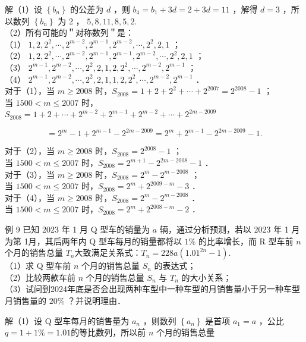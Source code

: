 \documentclass[10pt]{article}
\begin{document}
解（1）设 \(\left\{b_{n}\right\}\) 的公差为 \(d\) ，则 \(b_{4}=b_{1}+3 d=2+3 d=11\) ，解得 \(d=3\) ，所以数列 \(\left\{b_{n}\right\}\) 为 2 ， \(5,8,11,8,5,2\).\\
（2）所有可能的＂对称数列＂是：\\
（1） \(1,2,2^{2}, \cdots, 2^{m-2}, 2^{m-1}, 2^{m-2}, \cdots, 2^{2}, 2,1\) ；\\
（2） \(1,2,2^{2}, \cdots, 2^{m-2}, 2^{m-1}, 2^{m-1}, 2^{m-2}, \cdots, 2^{2}, 2,1\) ；\\
（3） \(2^{m-1}, 2^{m-2}, \cdots, 2^{2}, 2,1,2,2^{2}, \cdots, 2^{m-2}, 2^{m-1}\) ；\\
（4） \(2^{m-1}, 2^{m-2}, \cdots, 2^{2}, 2,1,1,2,2^{2}, \cdots, 2^{m-2}, 2^{m-1}\) ．\\
对于（1），当 \(m \geqslant 2008\) 时，\(S_{2008}=1+2+2^{2}+\cdots+2^{2007}=2^{2008}-1\) ；\\
当 \(1500<m \leqslant 2007\) 时，\(S_{2008}=1+2+\cdots+2^{m-2}+2^{m-1}+2^{m-2}+\cdots+2^{2 m-2009}\)

\[
=2^{m}-1+2^{m-1}-2^{2 m-2009}=2^{m}+2^{m-1}-2^{2 m-2009}-1 .
\]

对于（2），当 \(m \geqslant 2008\) 时，\(S_{2008}=2^{2008}-1\) ；\\
当 \(1500<m \leqslant 2007\) 时，\(S_{2008}=2^{m+1}-2^{2 m-2008}-1\) ．\\
对于（3），当 \(m \geqslant 2008\) 时，\(S_{2008}=2^{m}-2^{m-2008}\) ；\\
当 \(1500<m \leqslant 2007\) 时，\(S_{2008}=2^{m}+2^{2009-m}-3\) ．\\
对于（4），当 \(m \geqslant 2008\) 时，\(S_{2008}=2^{m}-2^{m-2008}\) ．\\
当 \(1500<m \leqslant 2007\) 时，\(S_{2008}=2^{m}+2^{2008-m}-2\) ．

例 9 已知 2023 年 1 月 Q 型车的销量为 \(a\) 辆，通过分析预测，若以 2023 年 1 月为第 1月，其后两年内 Q 型车每月的销量都将以 \(1 \%\) 的比率增长，而 R 型车前 \(n\) 个月的销售总量 \(T_{n}\)大致满足关系式：\(T_{n}=228 a\left(1.01^{2 n}-1\right)\).\\
（1）求 Q 型车前 \(n\) 个月的销售总量 \(S_{n}\) 的表达式；\\
（2）比较两款车前 \(n\) 个月的销售总量 \(S_{n}\) 与 \(T_{n}\) 的大小关系；\\
（3）试问到2024年底是否会出现两种车型中一种车型的月销售量小于另一种车型月销售量的 \(20 \%\) ？并说明理由．

解（1）设 Q 型车每月的销售量为 \(a_{n}\) ，则数列 \(\left\{a_{n}\right\}\) 是首项 \(a_{1}=a\) ，公比 \(q=1+1 \%=1.01\)的等比数列，所以前 \(n\) 个月的销售总量
\end{document}
